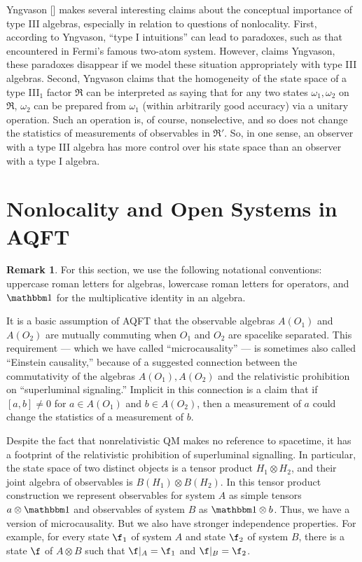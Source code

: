 \documentclass[11pt]{article}
\theoremstyle{definition}
\theoremstyle{definition}
\newtheorem{note}[thm]{Remark}
\theoremstyle{remark}
\def\8#1{{\mathbbm #1}}
\def\al#1{{\mathfrak #1}}
\def\om{\omega} \def\Om{\Omega} \def\dd{\partial} \def\D{\Delta}
\begin{document}
Yngvason [\citeyear{yng}] makes several interesting claims about the
conceptual importance of type III algebras, especially in relation to
questions of nonlocality.  First, according to Yngvason, ``type I
intuitions'' can lead to paradoxes, such as that encountered in
Fermi's famous two-atom system.  However, claims Yngvason, these
paradoxes disappear if we model these situation appropriately with
type III algebras.  Second, Yngvason claims that the homogeneity of
the state space of a type III$_1$ factor $\al R$ can be interpreted as
saying that for any two states $\om _1,\om _2$ on $\al R$, $\om _2$
can be prepared from $\om _1$ (within arbitrarily good accuracy) via a
unitary operation.  Such an operation is, of course, nonselective, and
so does not change the statistics of measurements of observables in
$\al R'$.  So, in one sense, an observer with a type III algebra has
more control over his state space than an observer with a type I
algebra.


\section{Nonlocality and Open Systems in AQFT}  \label{summers}

\begin{note} For this section, we use the following notational
  conventions: uppercase roman letters for algebras, lowercase roman
  letters for operators, and $\81$ for the multiplicative identity in
  an algebra. \end{note}

It is a basic assumption of AQFT that the observable algebras $A(O_1)$
and $A(O_2)$ are mutually commuting when $O_1$ and $O_2$ are spacelike
separated.  This requirement --- which we have called
``microcausality'' --- is sometimes also called ``Einstein
causality,'' because of a suggested connection between the
commutativity of the algebras $A(O_1),A(O_2)$ and the relativistic
prohibition on ``superluminal signaling.''  Implicit in this
connection is a claim that if $[a,b]\neq 0$ for $a\in A(O_1)$ and
$b\in A(O_2)$, then a measurement of $a$ could change the statistics
of a measurement of $b$.

Despite the fact that nonrelativistic QM makes no reference to
spacetime, it has a footprint of the relativistic prohibition of
superluminal signalling.  In particular, the state space of two
distinct objects is a tensor product $H_1\otimes H_2$, and their joint
algebra of observables is $B(H_1)\otimes B(H_2)$.  In this tensor
product construction we represent observables for system $A$ as simple
tensors $a\otimes \81$ and observables of system $B$ as $\81 \otimes
b$.  Thus, we have a version of microcausality.  But we also have
stronger independence properties.  For example, for every state $\f
_1$ of system $A$ and state $\f _2$ of system $B$, there is a state
$\f$ of $A\otimes B$ such that $\f |_{A}=\f _1$ and $\f |_B = \f _2$.
\end{document}
